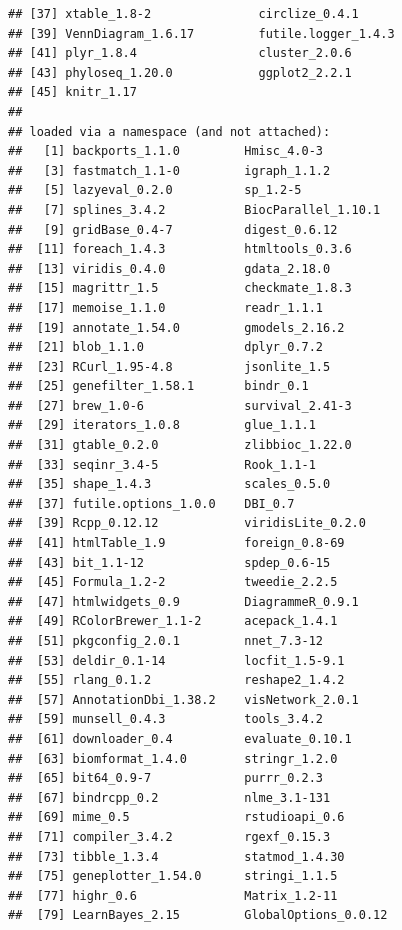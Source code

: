 \documentclass[12pt]{article}\usepackage[]{graphicx}\usepackage[]{color}
\makeatletter
\newenvironment{kframe}{%
 \def\at@end@of@kframe{}%
 \ifinner\ifhmode%
  \def\at@end@of@kframe{\end{minipage}}%
  \begin{minipage}{\columnwidth}%
 \fi\fi%
 \def\FrameCommand##1{\hskip\@totalleftmargin \hskip-\fboxsep
 \colorbox{shadecolor}{##1}\hskip-\fboxsep
     \hskip-\linewidth \hskip-\@totalleftmargin \hskip\columnwidth}%
 \MakeFramed {\advance\hsize-\width
   \@totalleftmargin\z@ \linewidth\hsize
   \@setminipage}}%
 {\par\unskip\endMakeFramed%
 \at@end@of@kframe}
\newenvironment{knitrout}{}{} %
\numberwithin{figure}{section}
\makeatother
\begin{document}
\begin{knitrout}
\begin{kframe}
\begin{verbatim}
## [37] xtable_1.8-2               circlize_0.4.1            
## [39] VennDiagram_1.6.17         futile.logger_1.4.3       
## [41] plyr_1.8.4                 cluster_2.0.6             
## [43] phyloseq_1.20.0            ggplot2_2.2.1             
## [45] knitr_1.17                
## 
## loaded via a namespace (and not attached):
##   [1] backports_1.1.0         Hmisc_4.0-3            
##   [3] fastmatch_1.1-0         igraph_1.1.2           
##   [5] lazyeval_0.2.0          sp_1.2-5               
##   [7] splines_3.4.2           BiocParallel_1.10.1    
##   [9] gridBase_0.4-7          digest_0.6.12          
##  [11] foreach_1.4.3           htmltools_0.3.6        
##  [13] viridis_0.4.0           gdata_2.18.0           
##  [15] magrittr_1.5            checkmate_1.8.3        
##  [17] memoise_1.1.0           readr_1.1.1            
##  [19] annotate_1.54.0         gmodels_2.16.2         
##  [21] blob_1.1.0              dplyr_0.7.2            
##  [23] RCurl_1.95-4.8          jsonlite_1.5           
##  [25] genefilter_1.58.1       bindr_0.1              
##  [27] brew_1.0-6              survival_2.41-3        
##  [29] iterators_1.0.8         glue_1.1.1             
##  [31] gtable_0.2.0            zlibbioc_1.22.0        
##  [33] seqinr_3.4-5            Rook_1.1-1             
##  [35] shape_1.4.3             scales_0.5.0           
##  [37] futile.options_1.0.0    DBI_0.7                
##  [39] Rcpp_0.12.12            viridisLite_0.2.0      
##  [41] htmlTable_1.9           foreign_0.8-69         
##  [43] bit_1.1-12              spdep_0.6-15           
##  [45] Formula_1.2-2           tweedie_2.2.5          
##  [47] htmlwidgets_0.9         DiagrammeR_0.9.1       
##  [49] RColorBrewer_1.1-2      acepack_1.4.1          
##  [51] pkgconfig_2.0.1         nnet_7.3-12            
##  [53] deldir_0.1-14           locfit_1.5-9.1         
##  [55] rlang_0.1.2             reshape2_1.4.2         
##  [57] AnnotationDbi_1.38.2    visNetwork_2.0.1       
##  [59] munsell_0.4.3           tools_3.4.2            
##  [61] downloader_0.4          evaluate_0.10.1        
##  [63] biomformat_1.4.0        stringr_1.2.0          
##  [65] bit64_0.9-7             purrr_0.2.3            
##  [67] bindrcpp_0.2            nlme_3.1-131           
##  [69] mime_0.5                rstudioapi_0.6         
##  [71] compiler_3.4.2          rgexf_0.15.3           
##  [73] tibble_1.3.4            statmod_1.4.30         
##  [75] geneplotter_1.54.0      stringi_1.1.5          
##  [77] highr_0.6               Matrix_1.2-11          
##  [79] LearnBayes_2.15         GlobalOptions_0.0.12   

\end{verbatim}
\end{kframe}
\end{knitrout}
\end{document}
